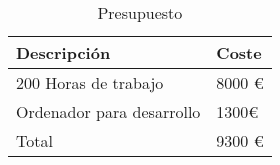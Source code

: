 \begin{table}[!ht]
\begin{center}
\begin{tabular}{|p{80mm}|p{40mm}|} \hline 
\textbf{Descripción } & \textbf{Coste} \\ \hline
200 Horas de trabajo &
8000 \euro
\\
\hline

Ordenador para desarrollo &
1300\euro
\\
\hline

Total &
9300 \euro
\\
\hline

\end{tabular}
\end{center}
\caption{Presupuesto}
\label{table:resOthers}
\end{table}

